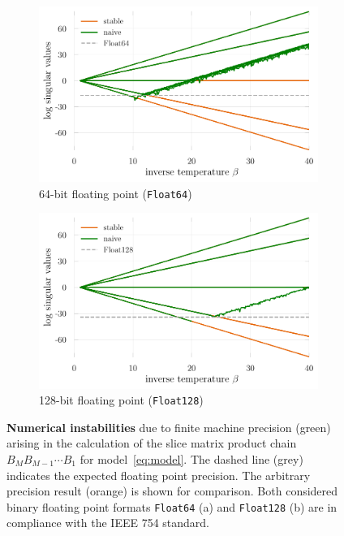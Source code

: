 \documentclass[submission, Phys]{SciPost}
\begin{document}
\begin{figure}
	\centering
	\begin{subfigure}{0.48\textwidth}
		\includegraphics[width=\textwidth]{figures/naive_vs_stable.pdf}
		\caption{64-bit floating point (\texttt{Float64}) \label{fig:naive_vs_stable_float64}}
	\end{subfigure}%
	\hspace{10pt}
	\begin{subfigure}{0.48\textwidth}
		\includegraphics[width=\textwidth]{figures/naive_vs_stable_float128.pdf}
		\caption{128-bit floating point (\texttt{Float128}) \label{fig:naive_vs_stable_float128}}
	\end{subfigure}
	\vspace{5pt}
	\caption[MyCaption]{\textbf{Numerical instabilities} due to finite machine precision (green) arising in the calculation of the slice matrix product chain $B_M B_{M-1} \cdots B_1$ for model~\eqref{eq:model}. The dashed line (grey) indicates the expected floating point precision\protect\footnotemark. The arbitrary precision result (orange) is shown for comparison. Both considered binary floating point formats \texttt{Float64} (a) and \texttt{Float128} (b) are in compliance with the IEEE 754 standard.}
	\label{fig:naive_vs_stable}
\end{figure}
\end{document}
